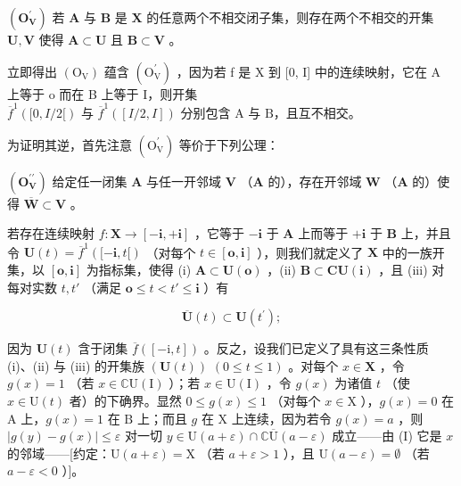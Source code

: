 \((\mathbf{O}_{\mathbf{V}}^{\prime})\) 若 \(\mathbf{A}\) 与 \(\mathbf{B}\) 是 \(\mathbf{X}\) 的任意两个不相交闭子集，则存在两个不相交的开集 \(\mathbf{U}, \mathbf{V}\) 使得 \(\mathbf{A} \subset \mathbf{U}\) 且 \(\mathbf{B} \subset \mathbf{V}\) 。

立即得出 \((\mathrm{O}_{\mathrm{V}})\) 蕴含 \((\mathrm{O}_{\mathrm{V}}^{\prime})\) ，因为若 f 是 X 到 {[}0, I{]} 中的连续映射，它在 A 上等于 o 而在 B 上等于 I，则开集 \(\overline{f}^{1}([0, I/2[)\text{ 与 }\overline{f}^{1}([I/2,I])\text{ 分别包含 A 与 B，且互不相交。}\)

为证明其逆，首先注意 \((\mathrm{O}_{\mathrm{V}}^{\prime})\) 等价于下列公理：

\((\mathbf{O}_{\mathbf{V}}^{\prime \prime})\) 给定任一闭集 \(\mathbf{A}\) 与任一开邻域 \(\mathbf{V}\) （\(\mathbf{A}\) 的），存在开邻域 \(\mathbf{W}\) （\(\mathbf{A}\) 的）使得 \(\overline{\mathbf{W}} \subset \mathbf{V}\) 。

若存在连续映射 \(f: \mathbf{X} \to [-\mathbf{i}, +\mathbf{i}]\) ，它等于 \(-\mathbf{i}\) 于 \(\mathbf{A}\) 上而等于 \(+\mathbf{i}\) 于 \(\mathbf{B}\) 上，并且令 \(\mathbf{U}(t) = \overline{f}^1([-\mathbf{i}, t[)\) （对每个 \(t \in [\mathbf{o}, \mathbf{i}]\) ），则我们就定义了 \(\mathbf{X}\) 中的一族开集，以 \([\mathbf{o}, \mathbf{i}]\) 为指标集，使得 (i) \(\mathbf{A} \subset \mathbf{U}(\mathbf{o})\) ，(ii) \(\mathbf{B} \subset \mathbf{C}\mathbf{U}(\mathbf{i})\) ，且 (iii) 对每对实数 \(t, t'\) （满足 \(\mathbf{o} \leqslant t < t' \leqslant \mathbf{i}\) ）有

\[
\overline {{{\mathbf {U}}}} (t) \subset \mathbf {U} (t ^ {\prime});\tag{1}
\]

因为 \(\mathbf{U}(t)\) 含于闭集 \(\overline{f}([-\mathrm{i}, t])\) 。反之，设我们已定义了具有这三条性质 (i)、(ii) 与 (iii) 的开集族 \((\mathbf{U}(t))\) \((0 \leqslant t \leqslant 1)\) 。对每个 \(x \in \mathbf{X}\) ，令 \(g(x) = 1\) （若 \(x \in \mathbb{C}\mathrm{U}(\mathrm{I})\) ）；若 \(x \in \mathrm{U}(\mathrm{I})\) ，令 \(g(x)\) 为诸值 \(t\) （使 \(x \in \mathrm{U}(t)\) 者）的下确界。显然 \(0 \leqslant g(x) \leqslant 1\) （对每个 \(x \in \mathrm{X}\) ），\(g(x) = 0\) 在 \(\mathrm{A}\) 上，\(g(x) = 1\) 在 \(\mathrm{B}\) 上；而且 \(g\) 在 \(\mathrm{X}\) 上连续，因为若令 \(g(x) = a\) ，则 \(|g(y) - g(x)| \leqslant \varepsilon\) 对一切 \(y \in \mathrm{U}(a + \varepsilon) \cap \mathbb{C}\overline{\mathrm{U}}(a - \varepsilon)\) 成立——由 (I) 它是 \(x\) 的邻域——{[}约定：\(\mathrm{U}(a + \varepsilon) = \mathrm{X}\) （若 \(a + \varepsilon > 1\) ），且 \(\mathrm{U}(a - \varepsilon) = \emptyset\) （若 \(a - \varepsilon < 0\) ）{]}。

